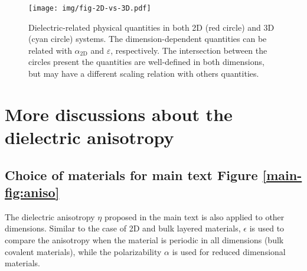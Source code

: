 \documentclass[manuscript=suppinfo,email=true,hyperref=true,keywords=false]{achemso}
\begin{document}
\begin{figure}[htbp]
\centering
\texttt{[image: img/fig-2D-vs-3D.pdf]}
\caption{\label{fig-2D-3D} Dielectric-related physical quantities in
  both 2D (red circle) and 3D (cyan circle) systems. The
  dimension-dependent quantities can be related with $\alpha_{\mathrm{2D}}$ and
  $\varepsilon$, respectively. The intersection between the circles
  present the quantities are well-defined in both dimensions, but may have a
  different scaling relation with others quantities.}
\end{figure}


\section{More discussions about the dielectric anisotropy}
\label{sec:aniso}

\subsection{Choice of materials for main text Figure \ref{main-fig:aniso}}
\label{ssec:aniso-materials}
The dielectric anisotropy $\eta$ proposed in the main text is also
applied to other dimensions. Similar to the case of 2D and bulk
layered materials, $\epsilon$ is used to compare the anisotropy when
the material is periodic in all dimensions (bulk covalent materials),
while the polarizability $\alpha$ is used for reduced dimensional
materials.
\end{document}

